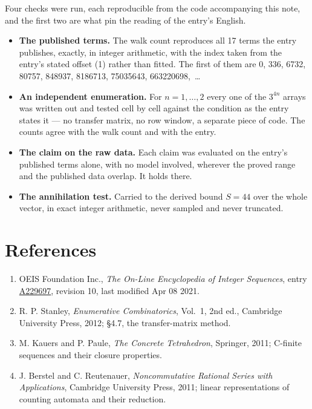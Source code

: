 \documentclass[11pt]{article}
\theoremstyle{definition}
\begin{document}
Four checks were run, each reproducible from the code accompanying this note, and the first two are what pin the reading of the entry's English.

\begin{itemize}

\item {\bfseries The published terms.} The walk count reproduces all 17 terms the entry publishes, exactly, in integer arithmetic, with the index taken from the entry's stated offset (1) rather than fitted. The first of them are 0, 336, 6732, 80757, 848937, 8186713, 75035643, 663220698,~\dots

\item {\bfseries An independent enumeration.} For $n = 1,\dots,2$ every one of the $3^{4n}$ arrays was written out and tested cell by cell against the condition as the entry states it --- no transfer matrix, no row window, a separate piece of code. The counts agree with the walk count and with the entry.

\item {\bfseries The claim on the raw data.} Each claim was evaluated on the entry's published terms alone, with no model involved, wherever the proved range and the published data overlap. It holds there.

\item {\bfseries The annihilation test.} Carried to the derived bound $S = 44$ over the whole vector, in exact integer arithmetic, never sampled and never truncated.

\end{itemize}

\section{References}

\begin{enumerate}

\item OEIS Foundation Inc., \emph{The On-Line Encyclopedia of Integer Sequences}, entry \href{https://oeis.org/A229697}{A229697}, revision 10, last modified Apr 08 2021.

\item R. P. Stanley, \emph{Enumerative Combinatorics}, Vol.~1, 2nd ed., Cambridge University Press, 2012; \S4.7, the transfer-matrix method.

\item M. Kauers and P. Paule, \emph{The Concrete Tetrahedron}, Springer, 2011; C-finite sequences and their closure properties.

\item J. Berstel and C. Reutenauer, \emph{Noncommutative Rational Series with Applications}, Cambridge University Press, 2011; linear representations of counting automata and their reduction.

\end{enumerate}
\end{document}
